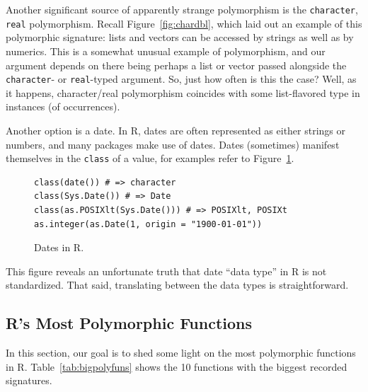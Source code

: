 \documentclass[acmsmall,10pt,review,anonymous]{acmart}\settopmatter{printfolios=true,printccs=false,printacmref=false}
\begin{document}

Another significant source of apparently strange polymorphism is the {\tt character}, {\tt real} polymorphism.
Recall Figure~\ref{fig:chardbl}, which laid out an example of this polymorphic signature: lists and vectors can be accessed by strings as well as by numerics.
This is a somewhat unusual example of polymorphism, and our argument depends on there being perhaps a list or vector passed alongside the {\tt character}- or {\tt real}-typed argument.
So, just how often is this the case?
Well, as it happens, character/real polymorphism coincides with some list-flavored type in \INDEXCOINCIDENCE instances (\INDEXYPERC of occurrences).

Another option is a date.
In R, dates are often represented as either strings or numbers, and many packages make use of dates.
Dates (sometimes) manifest themselves in the {\tt class} of a value, for examples refer to Figure~\ref{fig:date}.
\begin{figure}[!hb]{\small\begin{lstlisting}[style=R]
class(date()) # => character
class(Sys.Date()) # => Date
class(as.POSIXlt(Sys.Date())) # => POSIXlt, POSIXt
as.integer(as.Date(1, origin = "1900-01-01"))
\end{lstlisting}}\caption{Dates in R.}\label{fig:date}\end{figure}

This figure reveals an unfortunate truth that date ``data type'' in R is not standardized.
That said, translating between the data types is straightforward.

%
%
%
%
\subsection{R's Most Polymorphic Functions}

In this section, our goal is to shed some light on the most polymorphic functions in R.
Table~\ref{tab:bigpolyfuns} shows the 10 functions with the biggest recorded signatures.
\end{document}
